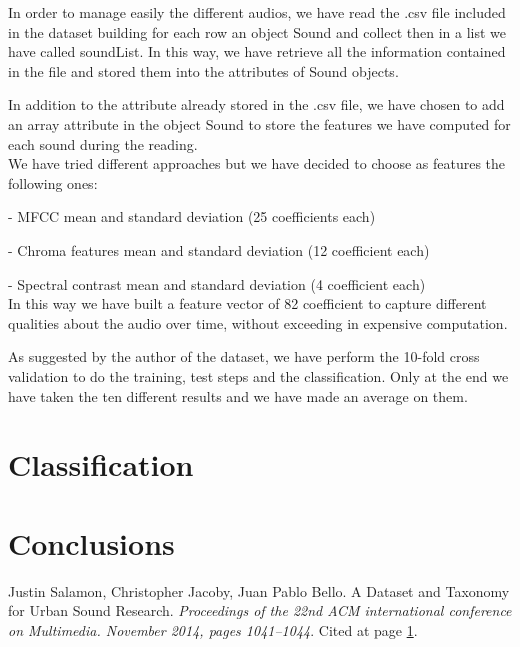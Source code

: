 \documentclass[letterpaper, 12pt]{article}
\begin{document}
	In order to manage easily the different audios, we have read the .csv file included in the dataset building for each row an object Sound and collect then in a list we have called soundList. In this way, we have retrieve all the information contained in the file and stored them into the attributes of Sound objects.
	
	In addition to the attribute already stored in the .csv file, we have chosen to add an array attribute in the object Sound to store the features we have computed for each sound during the reading. 
	\\
	
	We have tried different approaches but we have decided to choose as features the following ones:
	
	-	MFCC mean and standard deviation (25 coefficients each)
	
	-	Chroma features mean and standard deviation (12 coefficient each)
	
	-	Spectral contrast mean and standard deviation (4 coefficient each)
	\\
	
	In this way we have built a feature vector of 82 coefficient to capture different qualities about the audio over time, without exceeding in expensive computation.
	
	As suggested by the author of the dataset, we have perform the 10-fold cross validation to do the training, test steps and the classification. Only at the end we have taken the ten different results and we have made an average on them.
	
	
	
	\section{Classification}
	
	\section{Conclusions}
	
	\begin{thebibliography}{99}
		
		Justin Salamon, Christopher Jacoby, Juan Pablo Bello. A Dataset and Taxonomy for Urban Sound Research. \textit{Proceedings of the 22nd ACM international conference on Multimedia. November 2014, pages 1041–1044}. Cited at page \hyperlink{page.1}{1}.
		
		
	\end{thebibliography}

	
	
\end{document}

